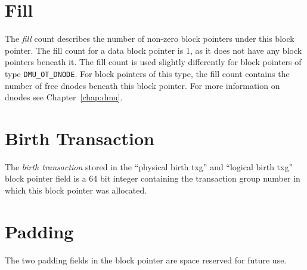 \section{Fill}

The \emph{fill} count describes the number of non-zero block pointers under this block pointer.
The fill count for a data block pointer is 1,
as it does not have any block pointers beneath it.
The fill count is used slightly differently for block pointers of type \lstinline{DMU_OT_DNODE}.
For block pointers of this type,
the fill count contains the number of free dnodes beneath this block pointer.
For more information on dnodes see Chapter~\ref{chap:dmu}.

\section{Birth Transaction}

The \emph{birth transaction} stored in the
``physical birth txg'' and ``logical birth txg''
block pointer field is a 64 bit integer
containing the transaction group number
in which this block pointer was allocated.

\section{Padding}

The two padding fields in the block pointer are space reserved for future use.
